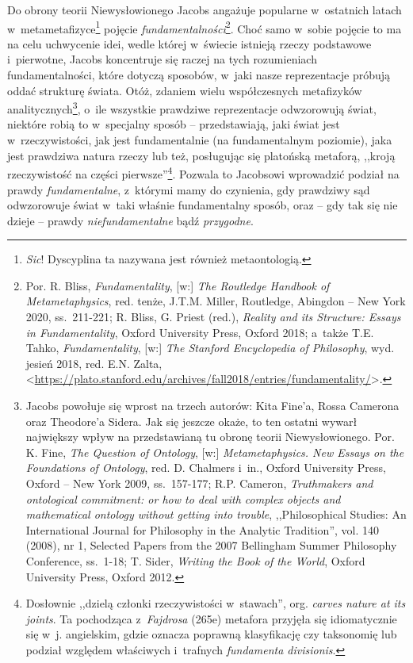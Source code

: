 Do obrony teorii Niewysłowionego Jacobs angażuje popularne w~ostatnich latach w~metametafizyce\footnote{\textit{Sic}! Dyscyplina ta nazywana jest również metaontologią.} pojęcie \textit{fundamentalności}\footnote{Por. R. Bliss, \textit{Fundamentality}, [w:] \textit{The Routledge Handbook of Metametaphysics}, red. tenże, J.T.M. Miller, Routledge, Abingdon -- New York 2020, ss.~211-221; R. Bliss, G. Priest (red.), \textit{Reality and its Structure: Essays in Fundamentality}, Oxford University Press, Oxford 2018; a~także T.E. Tahko, \textit{Fundamentality}, [w:] \textit{The Stanford Encyclopedia of Philosophy}, wyd. jesień 2018, red. E.N. Zalta, {\textless}\url{https://plato.stanford.edu/archives/fall2018/entries/fundamentality/}{\textgreater}.}.
Choć samo w~sobie pojęcie to ma na celu uchwycenie idei, wedle której w~świecie istnieją rzeczy podstawowe i~pierwotne, Jacobs koncentruje się raczej na tych rozumieniach fundamentalności, które dotyczą sposobów, w~jaki nasze reprezentacje próbują oddać strukturę świata. Otóż, zdaniem wielu współczesnych metafizyków analitycznych\footnote{Jacobs powołuje się wprost na trzech autorów: Kita Fine'a, Rossa Camerona oraz Theodore'a Sidera. Jak się jeszcze okaże, to ten ostatni wywarł największy wpływ na przedstawianą tu obronę teorii Niewysłowionego. Por. K. Fine, \textit{The Question of Ontology}, [w:] \textit{Metametaphysics. New Essays on the Foundations of Ontology}, red. D. Chalmers i~in., Oxford University Press, Oxford -- New York 2009, ss.~157-177; R.P. Cameron, \textit{Truthmakers and ontological commitment: or how to deal with complex objects and mathematical ontology without getting into trouble}, ,,Philosophical Studies: An International Journal for Philosophy in the Analytic Tradition'', vol. 140 (2008), nr 1, Selected Papers from the 2007 Bellingham Summer Philosophy Conference, ss.~1-18; T. Sider, \textit{Writing the Book of the World}, Oxford University Press, Oxford 2012.}, o~ile wszystkie prawdziwe reprezentacje odwzorowują świat, niektóre robią to w~specjalny sposób -- przedstawiają, jaki świat jest w~rzeczywistości, jak jest fundamentalnie (na fundamentalnym poziomie), jaka jest prawdziwa natura rzeczy lub też, posługując się platońską metaforą, ,,kroją rzeczywistość na części pierwsze''\footnote{Dosłownie ,,dzielą członki rzeczywistości w~stawach'', org. \textit{carves nature at its joints}. Ta pochodząca z~\textit{Fajdrosa} (265e) metafora przyjęła się idiomatycznie się w~j. angielskim, gdzie oznacza poprawną klasyfikację czy taksonomię lub podział względem właściwych i~trafnych \textit{fundamenta divisionis}.}. Pozwala to Jacobsowi wprowadzić podział na prawdy \textit{fundamentalne}, z~którymi mamy do czynienia, gdy prawdziwy sąd odwzorowuje świat w~taki właśnie fundamentalny sposób, oraz -- gdy tak się nie dzieje -- prawdy \textit{niefundamentalne} bądź \textit{przygodne}.

